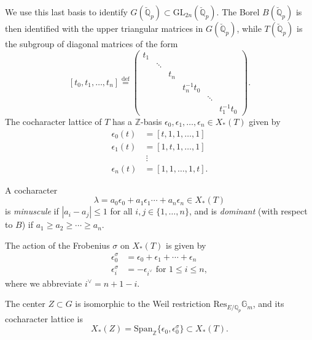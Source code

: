 \documentclass[11pt]{alggeom}
\newcommand{\define}{\stackrel{\mathrm{def}}{=}}
\newcommand{\Q}{\mathbb Q}
\newcommand{\Z}{\mathbb Z}
\begin{document}
We use this last basis to identify $G(\breve{\Q}_p) \subset \mathrm{GL}_{2n}(\breve{\Q}_p)$.
 The Borel  $B(\breve{\Q}_p)$ is then identified with the upper triangular matrices in $G(\breve{\Q}_p)$, while  $T(\breve{\Q}_p)$ is the subgroup  of diagonal matrices of the form
\[
[ t_0,t_1,\ldots, t_n]  \define \begin{pmatrix}
t_1 \\
& \ddots \\
& & t_n \\
& & &  t_n^{-1} t_0   \\
& & & & \ddots \\
& & & & &  t_1^{-1} t_0
\end{pmatrix}   .
\]  
The cocharacter lattice of $T$  has a $\Z$-basis
$
\epsilon_0,\epsilon_1,\ldots, \epsilon_n \in X_*(T)
$
given by
\begin{align*}
\epsilon_0(t)  &= [ t , 1 , 1 ,\ldots, 1] \\
 \epsilon_1(t) &  = [ 1 , t,1 ,\ldots, 1]  \\
 & \ \vdots \\
 \epsilon_n(t) & = [ 1,1,\ldots, 1,  t] .
\end{align*}


\begin{definition}
A cocharacter
\[
\lambda = a_0\epsilon_0+a_1\epsilon_1 \cdots + a_n\epsilon_n \in X_*(T)
\]
is \emph{minuscule} if $|a_i-a_j| \le 1$ for all $i,j \in \{1,\ldots, n\}$, and is  \emph{dominant} (with respect to  $B$) if  $a_1\ge a_2 \ge \cdots \ge a_n$.
\end{definition}





\begin{remark}
The action of the Frobenius $\sigma$ on $X_*(T)$ is given by 
\begin{align*}
\epsilon_0^\sigma  & = \epsilon_0+\epsilon_1+\cdots+\epsilon_n \\
\epsilon_i^\sigma & = - \epsilon_{i^\vee} \mbox{ for }1\le i \le n,
\end{align*}
where we abbreviate $i^\vee =  {n+1-i}$.  
\end{remark}


\begin{remark}
The center $Z \subset G$ is isomorphic to the Weil restriction $\mathrm{Res}_{E/\Q_p} \mathbb{G}_m$, and its cocharacter lattice is
\[
 X_*(Z) = \mathrm{Span}_\Z \{\epsilon_0,\epsilon_0^\sigma\}   \subset X_*(T).
\]
\end{remark}
\end{document}
